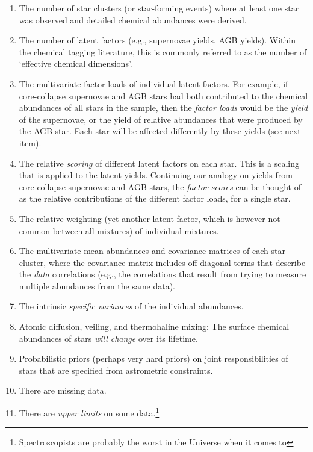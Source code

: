\documentclass{aastex61}
\begin{document}
\begin{enumerate}
\item The number of star clusters (or star-forming events) where at least one
      star was observed and detailed chemical abundances were derived.
\item The number of latent factors (e.g., supernovae yields, AGB yields).
      Within the chemical tagging literature, this is commonly referred to as
      the number of `effective chemical dimensions'.
\item The multivariate factor loads of individual latent factors. For example,
      if core-collapse supernovae and AGB stars had both contributed to the
      chemical abundances of all stars in the sample, then the
      \emph{factor loads} would be the \emph{yield} of the supernovae, or the
      yield of relative abundances that were produced by the AGB star. Each
      star will be affected differently by these yields (see next item).
\item The relative \emph{scoring} of different latent factors on each star.
      This is a scaling that is applied to the latent yields. Continuing our
      analogy on yields from core-collapse supernovae and AGB stars, the
      \emph{factor scores} can be thought of as the relative contributions of
      the different factor loads, for a single star.
\item The relative weighting (yet another latent factor, which is however not
      common between all mixtures) of individual mixtures.
\item The multivariate mean abundances and covariance matrices of each star
      cluster, where the covariance matrix includes off-diagonal terms that
      describe the \emph{data} correlations (e.g., the correlations that result
      from trying to measure multiple abundances from the same data).
\item The intrinsic \emph{specific variances} of the individual abundances.
\item Atomic diffusion, veiling, and thermohaline mixing: The surface chemical
      abundances of stars \emph{will change} over its lifetime.
\item Probabilistic priors (perhaps very hard priors) on joint responsibilities
      of stars that are specified from astrometric constraints.
\item There are missing data. 
\item There are \emph{upper limits} on some data.\footnote{
        Spectroscopists are probably the worst in the Universe when it comes to
}
\end{enumerate}
\end{document}
